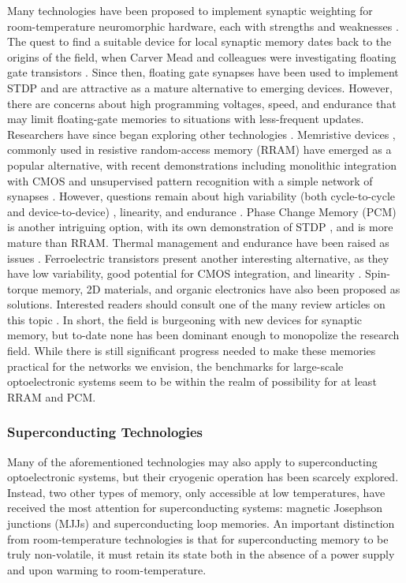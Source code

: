 \documentclass[twocolumn]{article}
\begin{document}
Many technologies have been proposed to implement synaptic weighting for room-temperature neuromorphic hardware, each with strengths and weaknesses \cite{upadhyay2019emerging}. The quest to find a suitable device for local synaptic memory dates back to the origins of the field, when Carver Mead and colleagues were investigating floating gate transistors \cite{diorio1998floating}. Since then, floating gate synapses have been used to implement STDP \cite{ramakrishnan2011floating} and are attractive as a mature alternative to emerging devices. However, there are concerns about high programming voltages, speed, and endurance that may limit floating-gate memories to situations with less-frequent updates. Researchers have since began exploring other technologies \cite{zahoor2020resistive}.  Memristive devices \cite{stsn2008,yast2012,ab2018}, commonly used in resistive random-access memory (RRAM) have emerged as a popular alternative, with recent demonstrations including monolithic integration with CMOS \cite{yin2019monolithically} and unsupervised pattern recognition with a simple network of synapses \cite{ielmini2018brain}. However, questions remain about high variability (both cycle-to-cycle and device-to-device) \cite{dalgaty2019hybrid}, linearity, and endurance \cite{zahoor2020resistive}. Phase Change Memory (PCM) is another intriguing option, with its own demonstration of STDP \cite{ambrogio2016unsupervised}, and is more mature than RRAM. Thermal management and endurance have been raised as issues \cite{upadhyay2019emerging, zahoor2020resistive}. Ferroelectric transistors present another interesting alternative, as they have low variability, good potential for CMOS integration, and linearity \cite{kim2019ferroelectric}.  Spin-torque memory, 2D materials, and organic electronics have also been proposed as solutions. Interested readers should consult one of the many review articles on this topic \cite{kim2018recent, upadhyay2019emerging, zhang2020brain}. In short, the field is burgeoning with new devices for synaptic memory, but to-date none has been dominant enough to monopolize the research field. While there is still significant progress needed to make these memories practical for the networks we envision, the benchmarks for large-scale optoelectronic systems seem to be within the realm of possibility for at least RRAM and PCM.

\subsubsection{Superconducting Technologies}
Many of the aforementioned technologies may also apply to superconducting optoelectronic systems, but their cryogenic operation has been scarcely explored. Instead, two other types of memory, only accessible at low temperatures, have received the most attention for superconducting systems: magnetic Josephson junctions (MJJs) and superconducting loop memories. An important distinction from room-temperature technologies is that for superconducting memory to be truly non-volatile, it must retain its state both in the absence of a power supply and upon warming to room-temperature.
\end{document}
